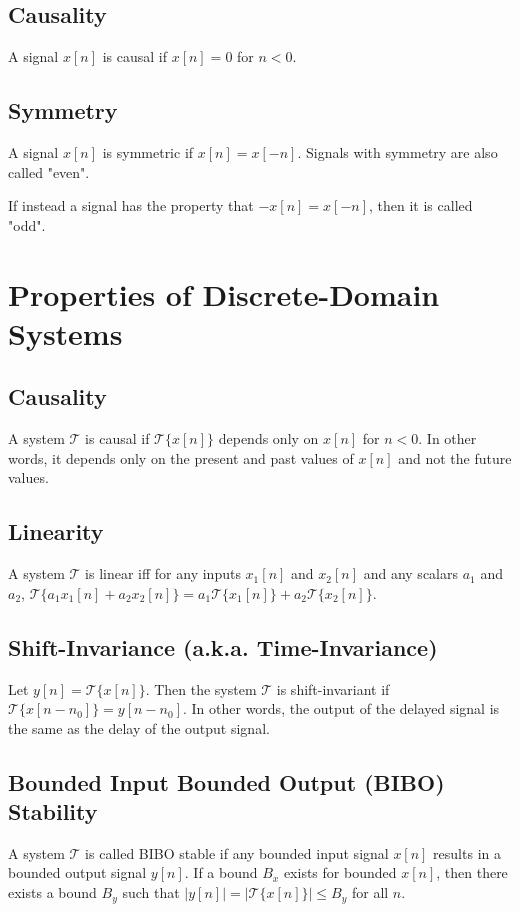 \documentclass[11pt]{article}
\begin{document}
\subsection{Causality}
A signal $x[n]$ is causal if $x[n]=0$ for $n<0$.

\subsection{Symmetry}
A signal $x[n]$ is symmetric if $x[n] = x[-n]$. Signals with symmetry are also called "even".

If instead a signal has the property that $-x[n] = x[-n]$, then it is called "odd".


\section{Properties of Discrete-Domain Systems}

\subsection{Causality}
A system $\mathcal{T}$ is causal if $\mathcal{T}\{x[n]\}$ depends only on $x[n]$ for $n < 0$. In other words, it depends only on the present and past values of $x[n]$ and not the future values.

\subsection{Linearity}
A system $\mathcal{T}$ is linear iff for any inputs $x_1[n]$ and $x_2[n]$ and any scalars $a_1$ and $a_2$, $\mathcal{T}\{a_1x_1[n]+a_2x_2[n]\} = a_1\mathcal{T}\{x_1[n]\}+a_2\mathcal{T}\{x_2[n]\}$. 

\subsection{Shift-Invariance (a.k.a. Time-Invariance)}
Let $y[n] = \mathcal{T}\{x[n]\}$. Then the system $\mathcal{T}$ is shift-invariant if $\mathcal{T}\{x[n-n_0]\} = y[n-n_0]$. In other words, the output of the delayed signal is the same as the delay of the output signal.

\subsection{Bounded Input Bounded Output (BIBO) Stability}
A system $\mathcal{T}$ is called BIBO stable if any bounded input signal $x[n]$ results in a bounded output signal $y[n]$. If a bound $B_x$ exists for bounded $x[n]$, then there exists a bound $B_y$ such that $|y[n]|=|\mathcal{T}\{x[n]\}| \leq B_y$ for all $n$.
\end{document}
